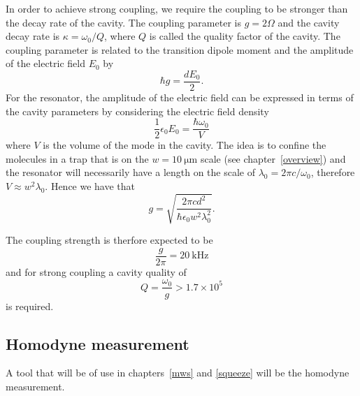 In order to achieve strong coupling, we require the coupling to be stronger
than the decay rate of the cavity. The coupling parameter is $g= 2\Omega$ and
the cavity decay rate is $\kappa = \omega_0 / Q$, where $Q$ is called the
quality factor of the cavity. The coupling parameter is related to the
transition dipole moment  and the amplitude of the electric field
$E_0$ by
%
\begin{equation}
  \hbar g = \frac{d E_0}{2}.
\end{equation}
%
For the resonator, the amplitude of the electric field can be expressed in
terms of the cavity parameters by considering the electric field density
%
\begin{equation}
  \frac{1}{2} \epsilon_0 E_0 = \frac{\hbar \omega_0}{V}
\end{equation}
%
where $V$ is the volume of the mode in the cavity. The idea is to confine the
molecules in a trap that is on the $w=\SI{10}{\micro\meter}$ scale (see
chapter~\ref{overview}) and the resonator will necessarily have a length on the
scale of $\lambda_0 = 2\pi c / \omega_0$, therefore $V\approx w^2\lambda_0$.
Hence we have that
%
\begin{equation}
  g = \sqrt{\frac{2\pi c d^2}{\hbar \epsilon_0 w^2 \lambda_0^2}}.
\end{equation}

The coupling strength is therfore expected to be
%
\begin{equation}
  \frac{g}{2\pi} = \SI{20}{\kilo\hertz}
\end{equation}
%
and for strong coupling a cavity quality of
%
\begin{equation}
  Q = \frac{\omega_0}{g} > 1.7 \times 10^5
\end{equation}
%
is required.

\subsection{Homodyne measurement}
\label{theory:QO:homodyne}

A tool that will be of use in chapters~\ref{mws} and \ref{squeeze} will be the
homodyne measurement. 
